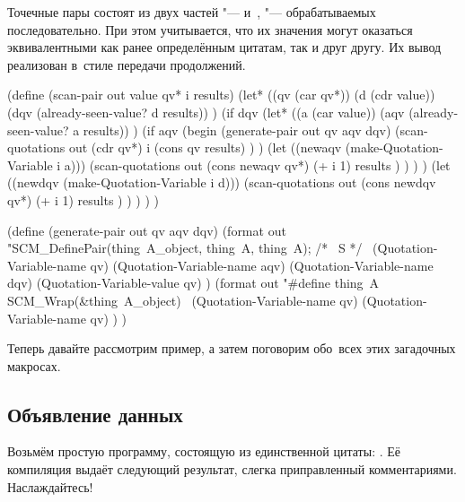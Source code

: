 Точечные пары состоят из двух частей "---  и~, "---
обрабатываемых последовательно. При этом учитывается, что их значения могут
оказаться эквивалентными как ранее определённым цитатам, так и друг другу. Их
вывод реализован в~стиле передачи продолжений.

\begin{code:lisp}
(define (scan-pair out value qv* i results)
  (let* ((qv  (car qv*))
         (d   (cdr value))
         (dqv (already-seen-value? d results)) )
    (if dqv
        (let* ((a   (car value))
               (aqv (already-seen-value? a results)) )
          (if aqv
              (begin
                (generate-pair out qv aqv dqv)
                (scan-quotations out (cdr qv*)
                                 i (cons qv results) ) )
              (let ((newaqv (make-Quotation-Variable i a)))
                (scan-quotations out (cons newaqv qv*)
                                 (+ i 1) results ) ) ) )
        (let ((newdqv (make-Quotation-Variable i d)))
          (scan-quotations
           out (cons newdqv qv*) (+ i 1) results ) ) ) ) )

(define (generate-pair out qv aqv dqv)
  (format out
          "SCM_DefinePair(thing~A_object, thing~A, thing~A); /* ~S */~%
          (Quotation-Variable-name qv)
          (Quotation-Variable-name aqv)
          (Quotation-Variable-name dqv)
          (Quotation-Variable-value qv) )
  (format out
          "#define thing~A SCM_Wrap(&thing~A_object)~%
          (Quotation-Variable-name qv)
          (Quotation-Variable-name qv) ) )
\end{code:lisp}

Теперь давайте рассмотрим пример, а затем поговорим обо~всех этих загадочных
макросах.


\subsection{Объявление данных}\label{cc/gen/ssect:decl}

Возьмём простую программу, состоящую из единственной цитаты: . Её компиляция выдаёт следующий результат,
слегка приправленный комментариями. Наслаждайтесь!


